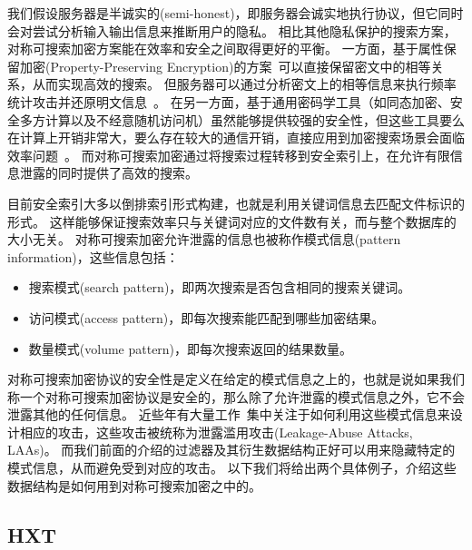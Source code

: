 我们假设服务器是半诚实的(semi-honest)，即服务器会诚实地执行协议，但它同时会对尝试分析输入输出信息来推断用户的隐私。
相比其他隐私保护的搜索方案，对称可搜索加密方案能在效率和安全之间取得更好的平衡。
一方面，基于属性保留加密(Property-Preserving Encryption)的方案~\cite{bellare2007deterministica}可以直接保留密文中的相等关系，从而实现高效的搜索。
但服务器可以通过分析密文上的相等信息来执行频率统计攻击并还原明文信息~\cite{naveed2015inferencea}。
在另一方面，基于通用密码学工具（如同态加密、安全多方计算以及不经意随机访问机）虽然能够提供较强的安全性，但这些工具要么在计算上开销非常大，要么存在较大的通信开销，直接应用到加密搜索场景会面临效率问题~\cite{ren2023searchable}。
而对称可搜索加密通过将搜索过程转移到安全索引上，在允许有限信息泄露的同时提供了高效的搜索。

目前安全索引大多以倒排索引形式构建，也就是利用关键词信息去匹配文件标识的形式。
这样能够保证搜索效率只与关键词对应的文件数有关，而与整个数据库的大小无关。
对称可搜索加密允许泄露的信息也被称作模式信息(pattern information)，这些信息包括：
\begin{itemize}
  \item 搜索模式(search pattern)，即两次搜索是否包含相同的搜索关键词。
  \item 访问模式(access pattern)，即每次搜索能匹配到哪些加密结果。
  \item 数量模式(volume pattern)，即每次搜索返回的结果数量。
\end{itemize}
对称可搜索加密协议的安全性是定义在给定的模式信息之上的，也就是说如果我们称一个对称可搜索加密协议是安全的，那么除了允许泄露的模式信息之外，它不会泄露其他的任何信息。
近些年有大量工作~\cite{cash2015leakageabuse,grubbs2018pump,gui2019encrypted,blackstone2020revisiting,ning2021leap,kamara2022sok}集中关注于如何利用这些模式信息来设计相应的攻击，这些攻击被统称为泄露滥用攻击(Leakage-Abuse Attacks, LAAs)。
而我们前面的介绍的过滤器及其衍生数据结构正好可以用来隐藏特定的模式信息，从而避免受到对应的攻击。
以下我们将给出两个具体例子，介绍这些数据结构是如何用到对称可搜索加密之中的。


\subsection{HXT}

